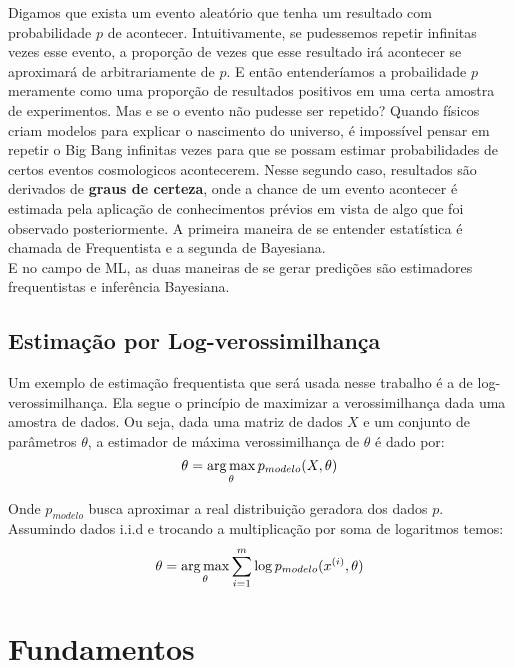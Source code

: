 Digamos que exista um evento aleatório que tenha um resultado com probabilidade $p$ de acontecer. Intuitivamente, se pudessemos repetir infinitas vezes esse evento, a proporção de vezes que esse resultado irá acontecer se aproximará de arbitrariamente de $p$. E então entenderíamos a probailidade $p$ meramente como uma proporção de resultados positivos em uma certa amostra de experimentos. Mas e se o evento não pudesse ser repetido? Quando físicos criam modelos para explicar o nascimento do universo, é impossível pensar em repetir o Big Bang infinitas vezes para que se possam estimar probabilidades de certos eventos cosmologicos acontecerem. Nesse segundo caso, resultados são derivados de \textbf{graus de certeza}, onde a chance de um evento acontecer é estimada pela aplicação de conhecimentos prévios em vista de algo que foi observado posteriormente. A primeira maneira de se entender estatística é chamada de Frequentista e a segunda de Bayesiana. \\

E no campo de ML, as duas maneiras de se gerar predições são estimadores frequentistas e inferência Bayesiana.

\subsection{Estimação por Log-verossimilhança}

Um exemplo de estimação frequentista que será usada nesse trabalho é a de log-verossimilhança. 
Ela segue o princípio de maximizar a verossimilhança dada uma amostra de dados. Ou seja, dada uma matriz de dados $X$ e um conjunto de parâmetros $\theta$, a estimador de máxima verossimilhança de $\theta$ é dado por: \\

\[ \theta = \operatorname*{arg\,max}_{\theta} p_{modelo}(X,\theta) \] 

Onde $p_{modelo}$ busca aproximar a real distribuição geradora dos dados $p$. Assumindo dados i.i.d e trocando a multiplicação por soma de logaritmos temos: \\

\[ \theta = \operatorname*{arg\,max}_{\theta} \sum_{i=1}^{m} \log p_{modelo}(x^{(i)},\theta) \]



\section{Fundamentos}
\label{sec:fundamentos}

